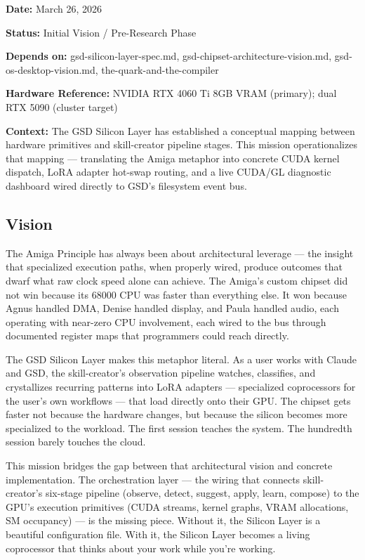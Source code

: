 \documentclass[11pt,letterpaper]{article}
\newcommand{\metafield}[2]{\textbf{\sffamily #1} #2\par}
\begin{document}
\metafield{Date:}{March 26, 2026}
\metafield{Status:}{Initial Vision / Pre-Research Phase}
\metafield{Depends on:}{gsd-silicon-layer-spec.md, gsd-chipset-architecture-vision.md, gsd-os-desktop-vision.md, the-quark-and-the-compiler}
\metafield{Hardware Reference:}{NVIDIA RTX 4060 Ti 8GB VRAM (primary); dual RTX 5090 (cluster target)}
\metafield{Context:}{The GSD Silicon Layer has established a conceptual mapping between hardware primitives and skill-creator pipeline stages. This mission operationalizes that mapping --- translating the Amiga metaphor into concrete CUDA kernel dispatch, LoRA adapter hot-swap routing, and a live CUDA/GL diagnostic dashboard wired directly to GSD's filesystem event bus.}

\subsection{Vision}

The Amiga Principle has always been about architectural leverage --- the insight that specialized execution paths, when properly wired, produce outcomes that dwarf what raw clock speed alone can achieve. The Amiga's custom chipset did not win because its 68000 CPU was faster than everything else. It won because Agnus handled DMA, Denise handled display, and Paula handled audio, each operating with near-zero CPU involvement, each wired to the bus through documented register maps that programmers could reach directly.

The GSD Silicon Layer makes this metaphor literal. As a user works with Claude and GSD, the skill-creator's observation pipeline watches, classifies, and crystallizes recurring patterns into LoRA adapters --- specialized coprocessors for the user's own workflows --- that load directly onto their GPU. The chipset gets faster not because the hardware changes, but because the silicon becomes more specialized to the workload. The first session teaches the system. The hundredth session barely touches the cloud.

This mission bridges the gap between that architectural vision and concrete implementation. The orchestration layer --- the wiring that connects skill-creator's six-stage pipeline (observe, detect, suggest, apply, learn, compose) to the GPU's execution primitives (CUDA streams, kernel graphs, VRAM allocations, SM occupancy) --- is the missing piece. Without it, the Silicon Layer is a beautiful configuration file. With it, the Silicon Layer becomes a living coprocessor that thinks about your work while you're working.
\end{document}

